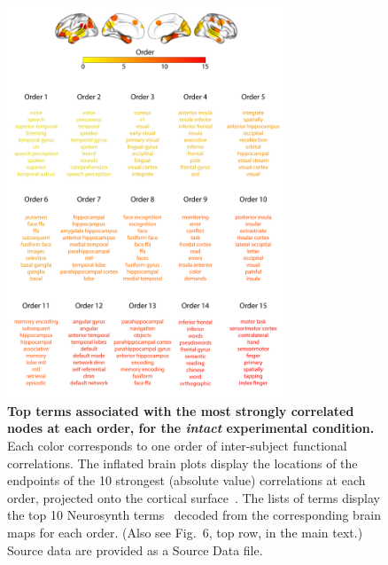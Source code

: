 \documentclass[english]{article}
\newcommand{\neurosynth}{6}
\begin{document}
\begin{figure}[p!]
\centering
\includegraphics[width=0.75\textwidth]{figs/supp_15_intact}
\caption{\textbf{Top terms associated with the most strongly
      correlated nodes at each order, for the \textit{intact} experimental
    condition.}  Each color corresponds to one order of inter-subject
functional correlations. The inflated brain plots display the
locations of the endpoints of the 10 strongest (absolute value)
correlations at each order, projected onto the cortical
surface~\citep{CombEtal19}.  The lists of terms display
the top 10 Neurosynth terms~\citep{RubiEtal17} decoded from the
corresponding brain maps for each order.  (Also see Fig.~\neurosynth,
top row, in the main text.) Source data are provided as a Source Data file.}
\label{fig:intact}
\end{figure}
\end{document}
